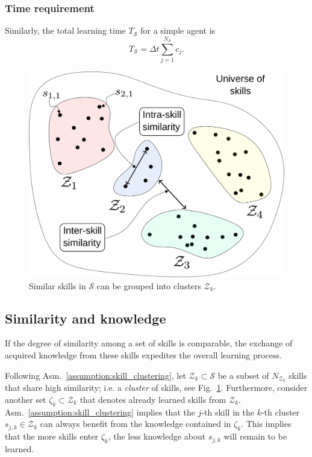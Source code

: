 \subsubsection{\textbf{Time requirement}}
Similarly, the total learning time $T_{\mathcal{S}}$ for a simple agent is
\begin{equation}\label{eq:total_energy}
	T_{\mathcal{S}} = \Delta t \sum_{j=1}^{{N_{\mathcal{S}}}} c_j.
\end{equation}
\begin{figure}[!t]
	\centering
	\includegraphics[width=0.95\columnwidth]{fig/skill_similarity.pdf}
	\caption{Similar skills in $\mathcal{S}$ can be grouped into clusters $\mathcal{Z}_k$.}
	\label{fig:skill_similarity}
\end{figure}
\subsection{Similarity and knowledge}
\begin{tcolorbox}
	\begin{assumption}\label{assumption:skill_clustering} If the degree of similarity among a set of skills is comparable, the exchange of acquired knowledge from these skills expedites the overall learning process.
		\end{assumption}
\end{tcolorbox}
Following Asm.~\ref{assumption:skill_clustering}, let $\mathcal{Z}_k \subset \mathcal{S}$ be a subset of $N_{\mathcal{Z}_k}$ skills that share high similarity; i.e. a \emph{cluster} of skills, see Fig.~\ref{fig:skill_similarity}. Furthermore, consider another set $\mathcal{\zeta}_k \subset \mathcal{Z}_k$ that denotes already learned skills from $\mathcal{Z}_k$. Asm.~\ref{assumption:skill_clustering} implies that the $j$-th skill in the $k$-th cluster $s_{j,k} \in \mathcal{Z}_k$ can always benefit from the knowledge contained in $\mathcal{\zeta}_k$. This implies that the more skills enter $\mathcal{\zeta}_k$, the less knowledge about $ s_{j,k} $ will remain to be learned.

